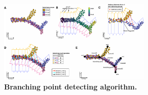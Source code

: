 \begin{figure}[!ht]
    \centering
    \includegraphics[width=0.65\textwidth]{branching/fig}
    \vspace{0.1cm}
    \caption[Branching point detecting algorithm.]{\textbf{Branching point detecting algorithm.} }
    \label{fig:branching}
\end{figure}


